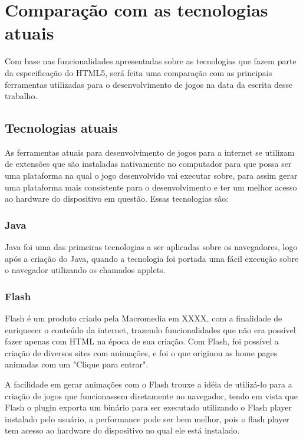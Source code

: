 \section{Comparação com as tecnologias atuais}

Com base nas funcionalidades apresentadas sobre as tecnologias que
fazem parte da especificação do HTML5, será feita uma comparação com
as principais ferramentas utilizadas para o desenvolvimento de jogos
na data da escrita desse trabalho.

\subsection{Tecnologias atuais}

As ferramentas atuais para desenvolvimento de jogos para a internet se
utilizam de extensões que são instaladas nativamente no computador
para que possa ser uma plataforma na qual o jogo desenvolvido vai
executar sobre, para assim gerar uma plataforma mais consistente para
o desenvolvimento e ter um melhor acesso ao hardware do dispositivo em
questão. Essas tecnologias são:

\subsubsection{Java}

Java foi uma das primeiras tecnologias a ser aplicadas sobre os
navegadores, logo após a criação do Java, quando a tecnologia foi
portada uma fácil execução sobre o navegador utilizando os chamados
applets.

\subsubsection{Flash}

Flash é um produto criado pela Macromedia em XXXX, com a finalidade de
enriquecer o conteúdo da internet, trazendo funcionalidades que não
era possível fazer apenas com HTML na época de sua criação.
Com Flash, foi possível a criação de diversos sites com animações, e
foi o que originou as home pages animadas com um "Clique para entrar".

A facilidade em gerar animações com o Flash trouxe a idéia de
utilizá-lo para a criação de jogos que funcionassem diretamente no
navegador, tendo em vista que Flash o plugin exporta um binário para ser
executado utilizando o Flash player instalado pelo usuário, a
performance pode ser bem melhor, pois o flash player tem acesso ao
hardware do dispositivo no qual ele está instalado.

